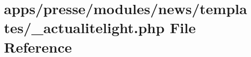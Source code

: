 \hypertarget{presse_2modules_2news_2templates_2__actualitelight_8php}{\section{apps/presse/modules/news/templates/\-\_\-actualitelight.php File Reference}
\label{presse_2modules_2news_2templates_2__actualitelight_8php}
}
